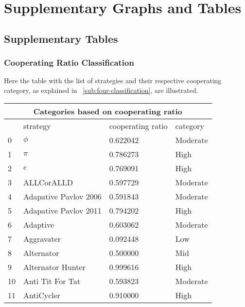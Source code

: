 \chapter{Supplementary Graphs and Tables}

\section{Supplementary Tables}
\subsection{Cooperating Ratio Classification}
\label{append:class-categories}
Here the table with the list of strategies and their respective cooperating
category, as explained in ~\ref{sub:four-classification}, are illustrated.

\begin{longtable}{|p{0.5cm}||p{6cm}||p{4cm}||p{2cm}|}
			\hline
			\multicolumn{4}{|c|}{Categories based on cooperating ratio}           \\ \hline
			    & strategy                    & cooperating ratio & category \\  \hline
			0   & $\phi$                      & 0.622042          & Moderate \\ \hline
			1   & $\pi$                       & 0.786273          & High     \\ \hline
			2   & $e$                         & 0.769091          & High     \\ \hline
			3   & ALLCorALLD                  & 0.597729          & Moderate \\ \hline
			4   & Adapative Pavlov 2006       & 0.591843          & Moderate \\ \hline
			5   & Adapative Pavlov 2011       & 0.794202          & High     \\ \hline
			6   & Adaptive                    & 0.603062          & Moderate \\ \hline
			7   & Aggravater                  & 0.092448          & Low      \\ \hline
			8   & Alternator                  & 0.500000          & Mid     \\ \hline
			9   & Alternator Hunter           & 0.999616          & High     \\ \hline
			10  & Anti Tit For Tat            & 0.593823          & Moderate \\ \hline
			11  & AntiCycler                  & 0.910000          & High     \\ \hline

\end{longtable}
